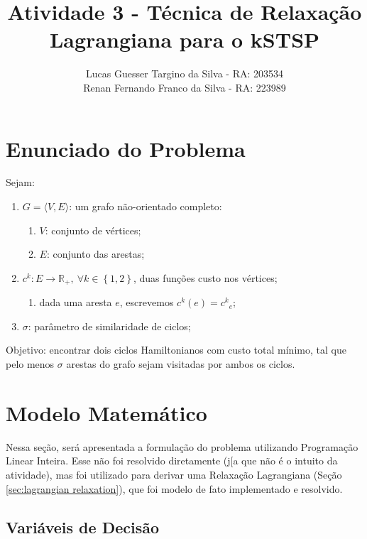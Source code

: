 \documentclass{article}
\title{Atividade 3 - Técnica de Relaxação Lagrangiana para o kSTSP}
\author{
	Lucas Guesser Targino da Silva - RA: 203534 \\
    Renan Fernando Franco da Silva - RA: 223989
}
\newcommand{\secref}[1]{(Seção \ref{#1})}
\newcommand{\Set}[1]{\ensuremath{\left\{#1\right\}}}
\newcommand{\edge}{\ensuremath{e}}
\newcommand{\edges}{\ensuremath{E}}
\newcommand{\vertices}{\ensuremath{V}}
\newcommand{\ncycles}{2}
\newcommand{\allCycles}{\ensuremath{\Set{1, \ncycles}}}
\newcommand{\cycle}{\ensuremath{k}}
\newcommand{\graph}{\ensuremath{G}}
\newcommand{\cost}[1]{\ensuremath{c^{#1}}}
\newcommand{\costk}{\ensuremath{\cost{\cycle}}}
\newcommand{\costke}{\ensuremath{\cost{\cycle}_{\edge}}}
\newcommand{\positiveReal}{\ensuremath{\mathbb{R}_+}}
\newcommand{\similarity}{\ensuremath{\sigma}}
\begin{document}
\maketitle

\section{Enunciado do Problema}

Sejam:

\begin{enumerate}
    \item $\graph = \langle \vertices,\edges \rangle$: um grafo não-orientado completo:
    \begin{enumerate}
        \item $\vertices$: conjunto de vértices;
        \item $\edges$: conjunto das arestas;
    \end{enumerate}
    \item $\costk: \edges \rightarrow \positiveReal,\ \forall \cycle \in \allCycles$, duas funções custo nos vértices;
        \begin{enumerate}
            \item dada uma aresta $\edge$, escrevemos $\costk(\edge) = \costke$;
        \end{enumerate}
    \item $\similarity$: parâmetro de similaridade de ciclos;
\end{enumerate}

Objetivo: encontrar dois ciclos Hamiltonianos com custo total mínimo, tal que pelo menos $\similarity$ arestas do grafo sejam visitadas por ambos os ciclos.

\section{Modelo Matemático}
\label{sec:mathematical model}

Nessa seção, será apresentada a formulação do problema utilizando Programação Linear Inteira. Esse não foi resolvido diretamente (j[a que não é o intuito da atividade), mas foi utilizado para derivar uma Relaxação Lagrangiana \secref{sec:lagrangian relaxation}, que foi modelo de fato implementado e resolvido.

\subsection{Variáveis de Decisão}
\label{constraint:variables}
\end{document}
